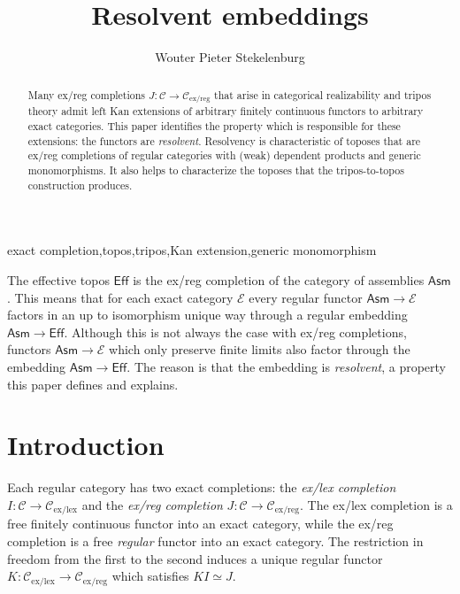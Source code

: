 \documentclass[sort&compress]{elsarticle}
\theoremstyle{plain}
\theoremstyle{definition}
\theoremstyle{remark}
\newcommand\cat\mathcal
\newcommand\exlex{_\mathrm{ex/lex}}
\newcommand\exreg{_\mathrm{ex/reg}}
\begin{document}
\begin{frontmatter}
\title{Resolvent embeddings}

\author[W. P. Stekelenburg]{Wouter Pieter Stekelenburg}
\address{Faculty of Mathematics, Informatics and Mechanics,
University of Warsaw,
Banacha 2,
02-097 Warszawa,
Poland}

\begin{abstract}
Many ex/reg completions $J:\cat C\to\cat C\exreg$ that arise in categorical realizability and tripos theory admit left Kan extensions of arbitrary finitely continuous functors to arbitrary exact categories. This paper identifies the property which is responsible for these extensions: the functors are \emph{resolvent}. Resolvency is characteristic of toposes that are ex/reg completions of regular categories with (weak) dependent products and generic monomorphisms. It also helps to characterize the toposes that the tripos-to-topos construction produces.
\end{abstract}

\begin{keyword}
exact completion\sep topos\sep tripos\sep Kan extension\sep generic monomorphism
\end{keyword}


\end{frontmatter}

\newcommand\RT{\mathsf{RT}}
\newcommand\Set{\mathsf{Set}}
\newcommand\pow{\mathbf P}
\newcommand\Eff{\mathsf{Eff}}
\newcommand\Asm{\mathsf{Asm}}

The effective topos $\Eff$ is the ex/reg completion of the category of assemblies $\Asm$. This means that for each exact category $\cat E$ every regular functor $\Asm \to \cat E$ factors in an up to isomorphism unique way through a regular embedding $\Asm\to \Eff$. Although this is not always the case with ex/reg completions, functors $\Asm\to\cat E$ which only preserve finite limits also factor through the embedding $\Asm \to \Eff$. The reason is that the embedding is \emph{resolvent}, a property this paper defines and explains.

\section{Introduction}
Each regular category has two exact completions: the \emph{ex/lex completion} $I:\cat C\to \cat C\exlex$ and the \emph{ex/reg completion} $J:\cat C\to\cat C\exreg$. The ex/lex completion is a free finitely continuous functor into an exact category, while the ex/reg completion is a free \emph{regular} functor into an exact category. The restriction in freedom from the first to the second induces a unique regular functor $K:\cat C\exlex\to\cat C\exreg$ which satisfies $KI\simeq J$.
\end{document}
